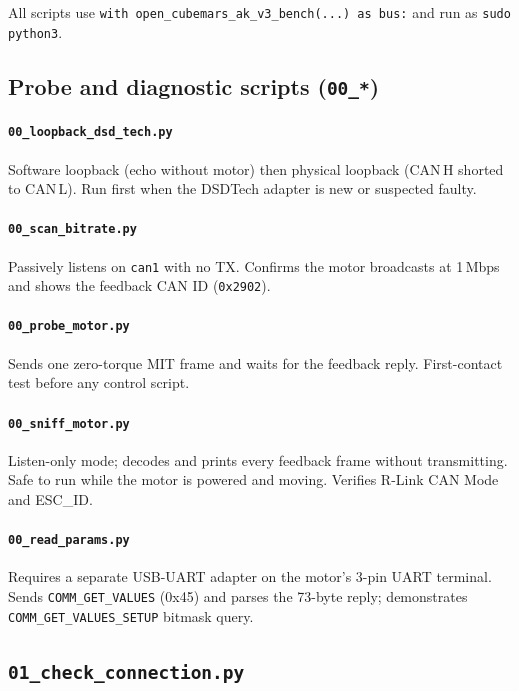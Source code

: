 \documentclass[11pt,a4paper]{article}
\begin{document}
All scripts use \texttt{with open\_cubemars\_ak\_v3\_bench(...) as bus:} and
run as \texttt{sudo python3}.

\subsection{Probe and diagnostic scripts (\texttt{00\_*})}

\paragraph{\texttt{00\_loopback\_dsd\_tech.py}}
Software loopback (echo without motor) then physical loopback (CAN\,H
shorted to CAN\,L).  Run first when the DSDTech adapter is new or
suspected faulty.

\paragraph{\texttt{00\_scan\_bitrate.py}}
Passively listens on \texttt{can1} with no TX.  Confirms the motor
broadcasts at 1\,Mbps and shows the feedback CAN ID (\texttt{0x2902}).

\paragraph{\texttt{00\_probe\_motor.py}}
Sends one zero-torque MIT frame and waits for the feedback reply.
First-contact test before any control script.

\paragraph{\texttt{00\_sniff\_motor.py}}
Listen-only mode; decodes and prints every feedback frame without
transmitting.  Safe to run while the motor is powered and moving.
Verifies R-Link CAN Mode and ESC\_ID.

\paragraph{\texttt{00\_read\_params.py}}
Requires a separate USB-UART adapter on the motor's 3-pin UART terminal.
Sends \texttt{COMM\_GET\_VALUES} (0x45) and parses the 73-byte reply;
demonstrates \texttt{COMM\_GET\_VALUES\_SETUP} bitmask query.

\subsection{\texttt{01\_check\_connection.py}}
\end{document}
